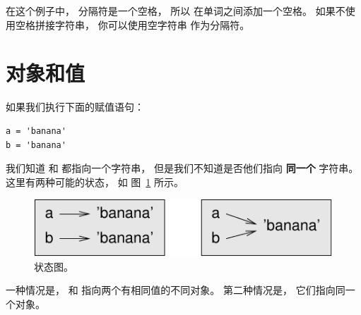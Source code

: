 %

在这个例子中， 分隔符是一个空格， 所以  在单词之间添加一个空格。  如果不使用空格拼接字符串， 你可以使用空字符串  作为分隔符。

  


\section{对象和值}
\label{equivalence}
  


如果我们执行下面的赋值语句：

\begin{lstlisting}
a = 'banana'
b = 'banana'
\end{lstlisting}

%

我们知道  和  都指向一个字符串， 但是我们不知道是否他们指向 {\bf 同一个} 字符串。  这里有两种可能的状态， 如 图~\ref{fig.list1} 所示。


\begin{figure}
\centerline
{\includegraphics[scale=0.8]{../source/figs/list1.pdf}}
\caption{状态图。}
\label{fig.list1}
\end{figure}


一种情况是，  和  指向两个有相同值的不同对象。
第二种情况是， 它们指向同一个对象。

